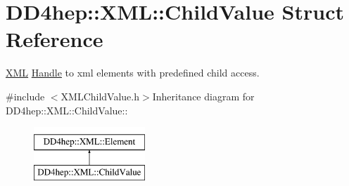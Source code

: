 \hypertarget{struct_d_d4hep_1_1_x_m_l_1_1_child_value}{
\section{DD4hep::XML::ChildValue Struct Reference}
\label{struct_d_d4hep_1_1_x_m_l_1_1_child_value}
}


\hyperlink{namespace_d_d4hep_1_1_x_m_l}{XML} \hyperlink{class_d_d4hep_1_1_handle}{Handle} to xml elements with predefined child access.  


{\ttfamily \#include $<$XMLChildValue.h$>$}Inheritance diagram for DD4hep::XML::ChildValue::\begin{figure}[H]
\begin{center}
\leavevmode
\includegraphics[height=2cm]{struct_d_d4hep_1_1_x_m_l_1_1_child_value}
\end{center}
\end{figure}
